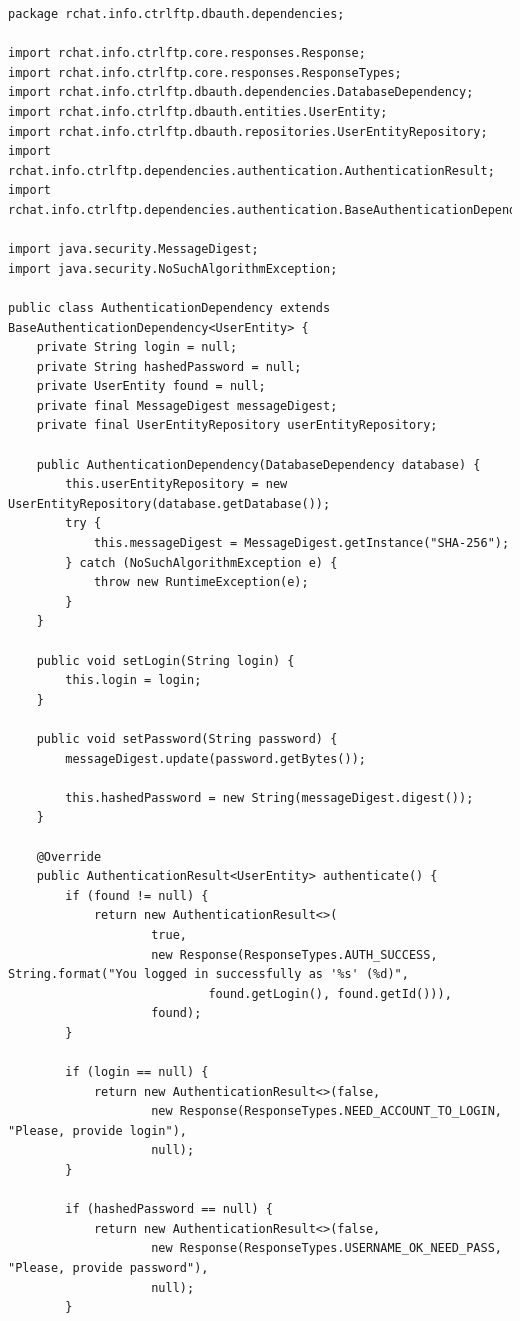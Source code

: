 \documentclass[a4paper,14pt]{extarticle}
\begin{document}
\begin{verbatim}
package rchat.info.ctrlftp.dbauth.dependencies;

import rchat.info.ctrlftp.core.responses.Response;
import rchat.info.ctrlftp.core.responses.ResponseTypes;
import rchat.info.ctrlftp.dbauth.dependencies.DatabaseDependency;
import rchat.info.ctrlftp.dbauth.entities.UserEntity;
import rchat.info.ctrlftp.dbauth.repositories.UserEntityRepository;
import rchat.info.ctrlftp.dependencies.authentication.AuthenticationResult;
import rchat.info.ctrlftp.dependencies.authentication.BaseAuthenticationDependency;

import java.security.MessageDigest;
import java.security.NoSuchAlgorithmException;

public class AuthenticationDependency extends BaseAuthenticationDependency<UserEntity> {
    private String login = null;
    private String hashedPassword = null;
    private UserEntity found = null;
    private final MessageDigest messageDigest;
    private final UserEntityRepository userEntityRepository;

    public AuthenticationDependency(DatabaseDependency database) {
        this.userEntityRepository = new UserEntityRepository(database.getDatabase());
        try {
            this.messageDigest = MessageDigest.getInstance("SHA-256");
        } catch (NoSuchAlgorithmException e) {
            throw new RuntimeException(e);
        }
    }

    public void setLogin(String login) {
        this.login = login;
    }

    public void setPassword(String password) {
        messageDigest.update(password.getBytes());

        this.hashedPassword = new String(messageDigest.digest());
    }

    @Override
    public AuthenticationResult<UserEntity> authenticate() {
        if (found != null) {
            return new AuthenticationResult<>(
                    true,
                    new Response(ResponseTypes.AUTH_SUCCESS, String.format("You logged in successfully as '%s' (%d)",
                            found.getLogin(), found.getId())),
                    found);
        }

        if (login == null) {
            return new AuthenticationResult<>(false,
                    new Response(ResponseTypes.NEED_ACCOUNT_TO_LOGIN, "Please, provide login"),
                    null);
        }

        if (hashedPassword == null) {
            return new AuthenticationResult<>(false,
                    new Response(ResponseTypes.USERNAME_OK_NEED_PASS, "Please, provide password"),
                    null);
        }


\end{verbatim}
\end{document}
